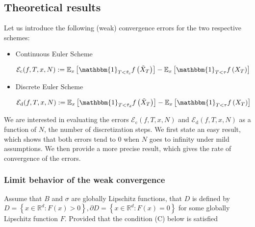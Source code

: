 \newpage

\subsection{Theoretical results}

Let us introduce the following (weak) convergence errors for the two respective schemes:

\begin{itemize}
    \item Continuous Euler Scheme

$$
\begin{aligned}
\mathcal{E}_{\mathrm{c}}(f, T, x, N):=\mathbb{E}_{x}\left[\mathbbm{1}_{T<\tilde{\tau}_{c}} f\left(\tilde{X}_{T}\right)\right]-\mathbb{E}_{x}\left[\mathbbm{1}_{T<\tau} f\left(X_{T}\right)\right]
\end{aligned}
$$

    \item Discrete Euler Scheme

$$
\begin{aligned}
\mathcal{E}_{\mathrm{d}}(f, T, x, N):=\mathbb{E}_{x}\left[\mathbbm{1}_{T<\tilde{\tau}_{d}} f\left(\tilde{X}_{T}\right)\right]-\mathbb{E}_{x}\left[\mathbbm{1}_{T<\tau} f\left(X_{T}\right)\right]
\end{aligned}
$$
\end{itemize}



We are interested in evaluating the errors $\mathcal{E}_{\mathrm{c}}(f, T, x, N)$ and $\mathcal{E}_{\mathrm{d}}(f, T, x, N)$ as a function of $N$, the number of discretization steps.
We first state an easy result, which shows that both errors tend to 0 when $N$ goes to infinity under mild assumptions.
We then provide a more precise result, which gives the rate of convergence of the errors.

\subsubsection{Limit behavior of the weak convergence}

Assume that $B$ and $\sigma$ are globally Lipschitz functions, that $D$ is defined by $D=\left\{x \in \mathbb{R}^{d}: F(x)>0\right\}, \partial D=\left\{x \in \mathbb{R}^{d}: F(x)=0\right\}$ for some globally Lipschitz function $F$. Provided that the condition (C) below is satisfied

